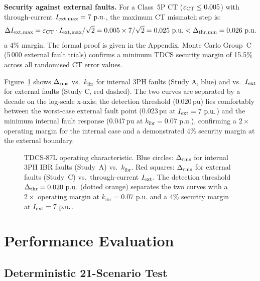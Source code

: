 \documentclass[journal,twoside,10pt]{IEEEtran}
\newcommand{\kibr}{k_{\mathrm{ibr}}}
\newcommand{\pu}{\,\text{p.u.}}
\begin{document}
\textbf{Security against external faults.}  For a Class~5P CT
($\varepsilon_{\rm CT} \leq 0.005$) with through-current
$I_{\rm ext,max} = 7\,\pu$, the maximum CT mismatch step is:
\begin{equation}
  \Delta I_{\rm ext,max} = \varepsilon_{\rm CT} \cdot I_{\rm ext,max}/\sqrt{2}
                         = 0.005 \times 7/\sqrt{2} = 0.025\,\pu
  < \Delta_{\rm thr,min} = 0.026\,\pu
  \label{eq:tdcs_security}
\end{equation}
a 4\% margin.  The formal proof is given in the Appendix.
Monte Carlo Group~C (5\,000 external fault trials) confirms a minimum
TDCS security margin of 15.5\% across all randomised CT error values.

Figure~\ref{fig:tdcs} shows $\Delta_{\rm rms}$ vs.\ $\kibr$ for internal
3PH faults (Study A, blue) and vs.\ $I_{\rm ext}$ for external faults
(Study C, red dashed).  The two curves are separated by a decade on the
log-scale x-axis; the detection threshold (0.020\,pu) lies comfortably
between the worst-case external fault point (0.023\,pu at $I_{\rm ext}=7\,\pu$)
and the minimum internal fault response (0.047\,pu at $\kibr=0.07\,\pu$),
confirming a $2\times$ operating margin for the internal case and a
demonstrated 4\% security margin at the external boundary.

\begin{figure}[!t]
  \centering
  
  \caption{TDCS-87L operating characteristic.  Blue circles: $\Delta_{\rm rms}$
           for internal 3PH IBR faults (Study~A) vs.\ $\kibr$.
           Red squares: $\Delta_{\rm rms}$ for external faults (Study~C) vs.\
           through-current $I_{\rm ext}$.
           The detection threshold $\Delta_{\rm thr}=0.020\,\pu$ (dotted orange)
           separates the two curves with a $2\times$ operating margin at
           $\kibr=0.07\,\pu$ and a 4\% security margin at $I_{\rm ext}=7\,\pu$.}
  \label{fig:tdcs}
\end{figure}

\section{Performance Evaluation}
\label{sec:eval}

\subsection{Deterministic 21-Scenario Test}
\label{sec:det}
\end{document}
